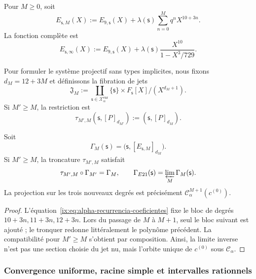Pour \(M\geq0\), soit
\begin{equation}
 E_{\mathsf s,M}(X):=E_{9,\mathsf s}(X)
 +\lambda(\mathsf s)\sum_{n=0}^{M}q^nX^{10+3n}.
 \label{ix:eq:alpha-truncamientos-completos}
\end{equation}
La fonction complète est
\begin{equation}
 E_{\mathsf s,\infty}(X)
 :=E_{9,\mathsf s}(X)
 +\lambda(\mathsf s)\frac{X^{10}}{1-X^3/729}.
 \label{ix:eq:alpha-funcion-completa-explicita}
\end{equation}

Pour formuler le système projectif sans types implicites, nous fixons \(d_M=12+3M\) et définissons la fibration de jets
\begin{equation}
 \mathfrak J_M:=
 \coprod_{\mathsf s\in\mathcal X_\alpha^{\mathrm{enr}}}
 \{\mathsf s\}\times F_{\mathsf s}[X]/(X^{d_M+1}).
 \label{ix:eq:alpha-espacio-jets-rev08}
\end{equation}
Si \(M'\ge M\), la restriction est
\begin{equation}
 \tau_{M',M}(\mathsf s,[P]_{d_{M'}})
 :=(\mathsf s,[P]_{d_M}).
 \label{ix:eq:alpha-truncamiento-jets-rev08}
\end{equation}

\begin{proposition}
\label{ix:prop:alpha-naturalidad-recurrencia-explicita}
Soit
\[
 \Gamma_M(\mathsf s)
 =\bigl(\mathsf s,[E_{\mathsf s,M}]_{d_M}\bigr).
\]
Si \(M'\geq M\), la troncature \(\tau_{M',M}\) satisfait
\begin{equation}
 \tau_{M',M}\circ\Gamma_{M'}=\Gamma_M,
 \qquad
 \Gamma_{E21}(\mathsf s)=\varprojlim_M\Gamma_M(\mathsf s).
 \label{ix:eq:alpha-naturalidad-explicita}
\end{equation}
La projection sur les trois nouveaux degrés est précisément
\(\mathcal C_\alpha^{M+1}(c^{(0)})\).
\end{proposition}

\begin{proof}
L'équation~\eqref{ix:eq:alpha-recurrencia-coeficientes} fixe le bloc de degrés \(10+3n,11+3n,12+3n\). Lors du passage de \(M\) à \(M+1\), seul le bloc suivant est ajouté ; le tronquer redonne littéralement le polynôme précédent. La compatibilité pour \(M'\geq M\) s'obtient par composition. Ainsi, la limite inverse n'est pas une section choisie du jet nu, mais l'orbite unique de \(c^{(0)}\) sous \(\mathcal C_\alpha\).
\end{proof}

\subsubsection{Convergence uniforme, racine simple et intervalles rationnels}
\label{ix:subsec:alpha-cotas-completas-rev08}


